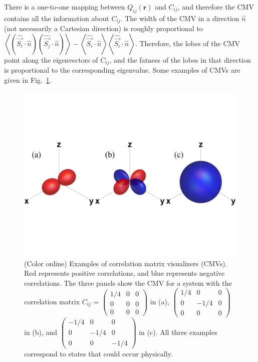 \documentclass[pra,reprint,superscriptaddress]{revtex4-1}
\newcommand{\expect}[1]{\left\langle #1 \right\rangle}
\begin{document}
There is a one-to-one mapping between $Q_{ij}(\mathbf{r})$ and $C_{ij}$, and therefore the CMV contains all the information about $C_{ij}$. The width of the CMV in a direction $\hat n$ (not necessarily a Cartesian direction) is roughly proportional to $\expect{(\hat{\vec{S_i}}\cdot \hat n) (\hat{\vec{S_j}}\cdot \hat n)}-\expect{\hat{\vec{S_i}}\cdot \hat n}\expect{\hat{\vec{S_i}}\cdot \hat n}$. Therefore, the lobes of the CMV point along the eigenvectors of $C_{ij}$, and the fatness of the lobes in that direction is proportional to the corresponding eigenvalue. Some examples of CMVs are given in Fig.~\ref{fig: CMV}.
\begin{figure}[t]\centering
 \includegraphics[width = \columnwidth]{CMV.pdf}
 \caption{(Color online) Examples of correlation matrix visualizers (CMVs). Red represents positive correlations, and blue represents negative correlations. The three panels show the CMV for a system with the correlation matrix $C_{ij}$ = $\left(\begin{array}{ccc}1/4&0&0\\0&0&0\\0&0&0\end{array}\right)$ in (a), $\left(\begin{array}{ccc}1/4&0&0\\0&-1/4&0\\0&0&0\end{array}\right)$ in (b), and $\left(\begin{array}{ccc}-1/4&0&0\\0&-1/4&0\\0&0&-1/4\end{array}\right)$ in (c). All three examples correspond to states that could occur physically.
 }
 \label{fig: CMV}
\end{figure}
\end{document}
